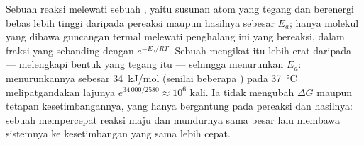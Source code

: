 \begin{proposition}\label{prop:b1:enzymes:whatitdoes}
Sebuah reaksi melewati sebuah \emph{}, yaitu susunan
atom yang tegang dan berenergi bebas lebih tinggi daripada pereaksi
maupun hasilnya sebesar \emph{} $E_a$; hanya molekul
yang dibawa guncangan termal melewati penghalang ini yang bereaksi,
dalam fraksi yang sebanding dengan $e^{-E_a/RT}$. Sebuah  mengikat
 itu lebih erat daripada  --- 
melengkapi bentuk yang tegang itu --- sehingga menurunkan $E_a$:
menurunkannya sebesar \qty{34}{kJ/mol} (senilai beberapa ) pada \qty{37}{\celsius} melipatgandakan lajunya
$e^{34\,000/2580} \approx
10^6$ kali. Ia tidak mengubah $\Delta G$ maupun tetapan
kesetimbangannya, yang hanya bergantung pada pereaksi dan hasilnya:
sebuah  mempercepat reaksi maju dan mundurnya sama besar lalu
membawa sistemnya ke kesetimbangan yang sama lebih cepat.
\end{proposition}

